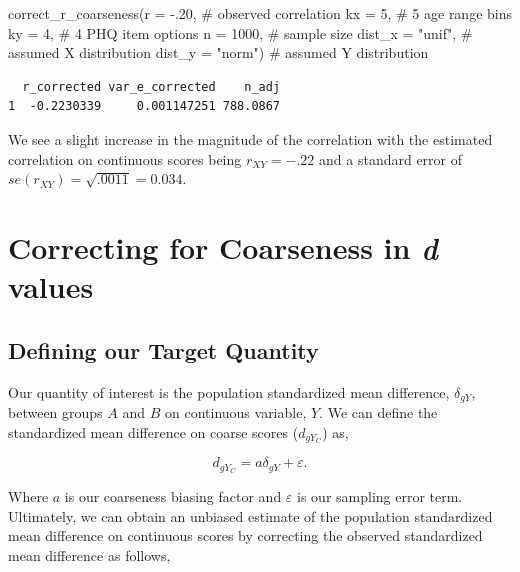 \documentclass[
  letterpaper,
  DIV=11,
  numbers=noendperiod]{scrreprt}
\newenvironment{Shaded}{}{}
\newcommand{\AttributeTok}[1]{\textcolor[rgb]{0.00,0.34,0.68}{#1}}
\newcommand{\CommentTok}[1]{\textcolor[rgb]{0.54,0.53,0.53}{#1}}
\newcommand{\DecValTok}[1]{\textcolor[rgb]{0.69,0.50,0.00}{#1}}
\newcommand{\FunctionTok}[1]{\textcolor[rgb]{0.39,0.29,0.61}{#1}}
\newcommand{\NormalTok}[1]{\textcolor[rgb]{0.12,0.11,0.11}{#1}}
\newcommand{\SpecialCharTok}[1]{\textcolor[rgb]{0.24,0.68,0.91}{#1}}
\newcommand{\StringTok}[1]{\textcolor[rgb]{0.75,0.01,0.01}{#1}}
\begin{document}
\begin{tcolorbox}
\begin{Shaded}
\begin{Highlighting}[]
\FunctionTok{correct\_r\_coarseness}\NormalTok{(}\AttributeTok{r =} \SpecialCharTok{{-}}\NormalTok{.}\DecValTok{20}\NormalTok{, }\CommentTok{\# observed correlation}
                     \AttributeTok{kx =} \DecValTok{5}\NormalTok{, }\CommentTok{\# 5 age range bins}
                     \AttributeTok{ky =} \DecValTok{4}\NormalTok{,  }\CommentTok{\# 4 PHQ item options}
                     \AttributeTok{n =} \DecValTok{1000}\NormalTok{, }\CommentTok{\# sample size}
                     \AttributeTok{dist\_x =} \StringTok{"unif"}\NormalTok{, }\CommentTok{\# assumed X distribution}
                     \AttributeTok{dist\_y =} \StringTok{"norm"}\NormalTok{) }\CommentTok{\# assumed Y distribution}
\end{Highlighting}
\end{Shaded}

\begin{verbatim}
  r_corrected var_e_corrected    n_adj
1  -0.2230339     0.001147251 788.0867
\end{verbatim}

We see a slight increase in the magnitude of the correlation with the
estimated correlation on continuous scores being \(r_{XY}=-.22\) and a
standard error of \(se(r_{XY})=\sqrt{.0011}=0.034\).

\end{tcolorbox}

\section{\texorpdfstring{Correcting for Coarseness in \emph{d}
values}{Correcting for Coarseness in d values}}\label{correcting-for-coarseness-in-d-values}

\subsection{Defining our Target
Quantity}\label{defining-our-target-quantity-3}

Our quantity of interest is the population standardized mean difference,
\(\delta_{gY}\), between groups \(A\) and \(B\) on continuous variable,
\(Y\). We can define the standardized mean difference on coarse scores
(\(d_{gY_C}\)) as,

\[
d_{gY_C} = a\delta_{gY}+\varepsilon.
\]

Where \(a\) is our coarseness biasing factor and \(\varepsilon\) is our
sampling error term. Ultimately, we can obtain an unbiased estimate of
the population standardized mean difference on continuous scores by
correcting the observed standardized mean difference as follows,
\end{document}
